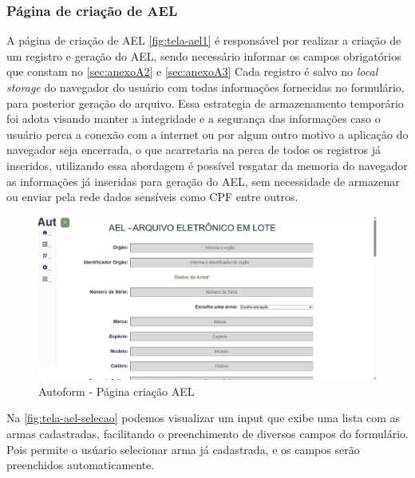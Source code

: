\subsubsection{Página de criação de AEL}
A página de criação de AEL \autoref{fig:tela-ael1} é responsável por realizar a criação de um registro e geração do AEL, sendo necessário informar os campos obrigatórios que constam no \autoref{sec:anexoA2} e \autoref{sec:anexoA3}
Cada registro é salvo no \textit{local storage} do navegador do usuário com todas informações fornecidas no formulário, para posterior geração do arquivo. 
Essa estrategia de armazenamento temporário foi adota visando manter a integridade e a segurança das informações caso o usuário perca a conexão com a internet ou por algum outro motivo a aplicação do navegador seja encerrada, o que acarretaria na perca de todos os registros já inseridos, utilizando essa abordagem é possível resgatar da memoria do navegador as informações já inseridas para geração do AEL, sem necessidade de armazenar ou enviar pela rede dados sensíveis como CPF entre outros. 

\begin{figure}[htb]
    \caption{\label{fig:tela-ael1}Autoform - Página criação AEL}
    \begin{center}
        \includegraphics[scale=0.5]{imagens/autoform-ael-gerar.png}
    \end{center}
\end{figure}


Na \autoref{fig:tela-ael-selecao} podemos visualizar um input que exibe uma lista com as armas cadastradas, facilitando o preenchimento de diversos campos do formulário.
Pois permite o usúario selecionar arma já cadastrada, e os campos serão preenchidos automaticamente.

